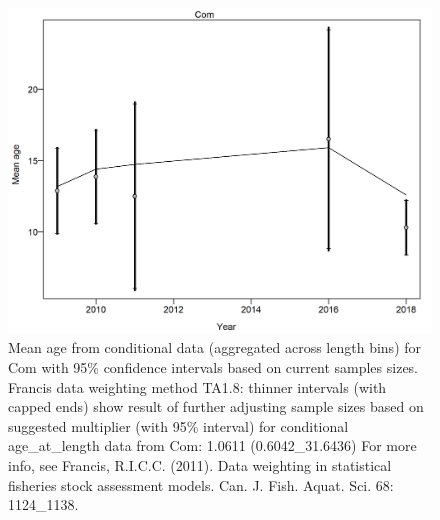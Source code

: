 \documentclass[12pt,]{article}
\begin{document}
\begin{figure}
\centering
\includegraphics{./r4ss/plots_mod1/comp_condAALfit_data_weighting_TA1.8_condAgeCom.png}
\caption{Mean age from conditional data (aggregated across length bins)
for Com with 95\% confidence intervals based on current samples sizes.
Francis data weighting method TA1.8: thinner intervals (with capped
ends) show result of further adjusting sample sizes based on suggested
multiplier (with 95\% interval) for conditional age\_at\_length data
from Com: 1.0611 (0.6042\_31.6436) For more info, see Francis, R.I.C.C.
(2011). Data weighting in statistical fisheries stock assessment models.
Can. J. Fish. Aquat. Sci. 68: 1124\_1138.
\label{fig:mod1_5_comp_condAALfit_data_weighting_TA1.8_condAgeCom}}
\end{figure}
\end{document}
